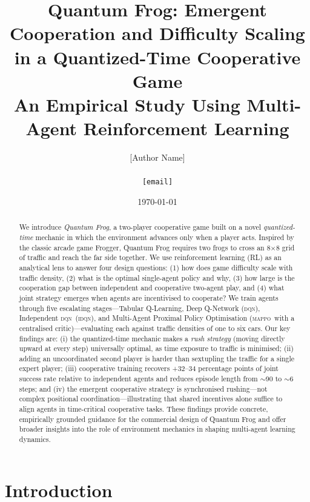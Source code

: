 \documentclass[12pt]{article}
\title{%
  \textbf{Quantum Frog: Emergent Cooperation and Difficulty Scaling}\\
  \textbf{in a Quantized-Time Cooperative Game}\\[6pt]
  \large An Empirical Study Using Multi-Agent Reinforcement Learning
}
\author{%
  [Author Name]\\
  [Institution]\\
  \texttt{[email]}
}
\date{\today}
\newcommand{\MAPPO}{\textsc{mappo}}
\newcommand{\IDQN}{\textsc{idqn}}
\newcommand{\DQN}{\textsc{dqn}}
\begin{document}
\maketitle

\begin{abstract}
We introduce \emph{Quantum Frog}, a two-player cooperative game built on a
novel \emph{quantized-time} mechanic in which the environment advances only
when a player acts.  Inspired by the classic arcade game Frogger, Quantum Frog
requires two frogs to cross an 8$\times$8 grid of traffic and reach the far
side together.  We use reinforcement learning (RL) as an analytical lens to
answer four design questions: (1) how does game difficulty scale with traffic
density, (2) what is the optimal single-agent policy and why, (3) how large is
the cooperation gap between independent and cooperative two-agent play, and
(4) what joint strategy emerges when agents are incentivised to cooperate?
We train agents through five escalating stages—Tabular Q-Learning, Deep
Q-Network (\DQN), Independent \DQN~(\IDQN), and Multi-Agent
Proximal Policy Optimisation (\MAPPO\ with a centralised critic)—evaluating
each against traffic densities of one to six cars.  Our key findings are:
(i) the quantized-time mechanic makes a \emph{rush strategy} (moving directly
upward at every step) universally optimal, as time exposure to traffic is
minimised; (ii) adding an uncoordinated second player is harder than sextupling
the traffic for a single expert player; (iii) cooperative training recovers
+32--34 percentage points of joint success rate relative to independent agents
and reduces episode length from $\sim$90 to $\sim$6 steps; and (iv) the
emergent cooperative strategy is synchronised rushing—not complex positional
coordination—illustrating that shared incentives alone suffice to align agents
in time-critical cooperative tasks.  These findings provide concrete,
empirically grounded guidance for the commercial design of Quantum Frog and
offer broader insights into the role of environment mechanics in shaping
multi-agent learning dynamics.
\end{abstract}

\tableofcontents
\newpage

\section{Introduction}
\label{sec:intro}
\end{document}
